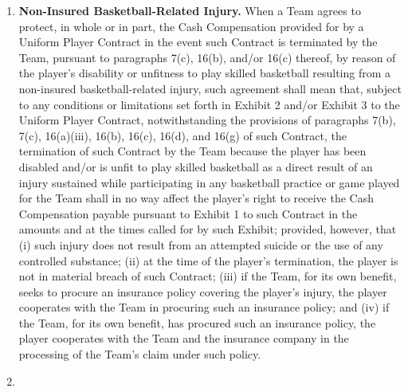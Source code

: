 \documentclass[
]{book}
\begin{document}
\begin{enumerate}
\item
  \textbf{Non-Insured Basketball-Related Injury.} When a Team agrees to protect, in whole or in part, the Cash Compensation provided for by a Uniform Player Contract in the event such Contract is terminated by the Team, pursuant to paragraphs 7(c), 16(b), and/or 16(c) thereof, by reason of the player's disability or unfitness to play skilled basketball resulting from a non-insured basketball-related injury, such agreement shall mean that, subject to any conditions or limitations set forth in Exhibit 2 and/or Exhibit 3 to the Uniform Player Contract, notwithstanding the provisions of paragraphs 7(b), 7(c), 16(a)(iii), 16(b), 16(c), 16(d), and 16(g) of such Contract, the termination of such Contract by the Team because the player has been disabled and/or is unfit to play skilled basketball as a direct result of an injury sustained while participating in any basketball practice or game played for the Team shall in no way affect the player's right to receive the Cash Compensation payable pursuant to Exhibit 1 to such Contract in the amounts and at the times called for by such Exhibit; provided, however, that (i) such injury does not result from an attempted suicide or the use of any controlled substance; (ii) at the time of the player's termination, the player is not in material breach of such Contract; (iii) if the Team, for its own benefit, seeks to procure an insurance policy covering the player's injury, the player cooperates with the Team in procuring such an insurance policy; and (iv) if the Team, for its own benefit, has procured such an insurance policy, the player cooperates with the Team and the insurance company in the processing of the Team's claim under such policy.
\item

\end{enumerate}
\end{document}

